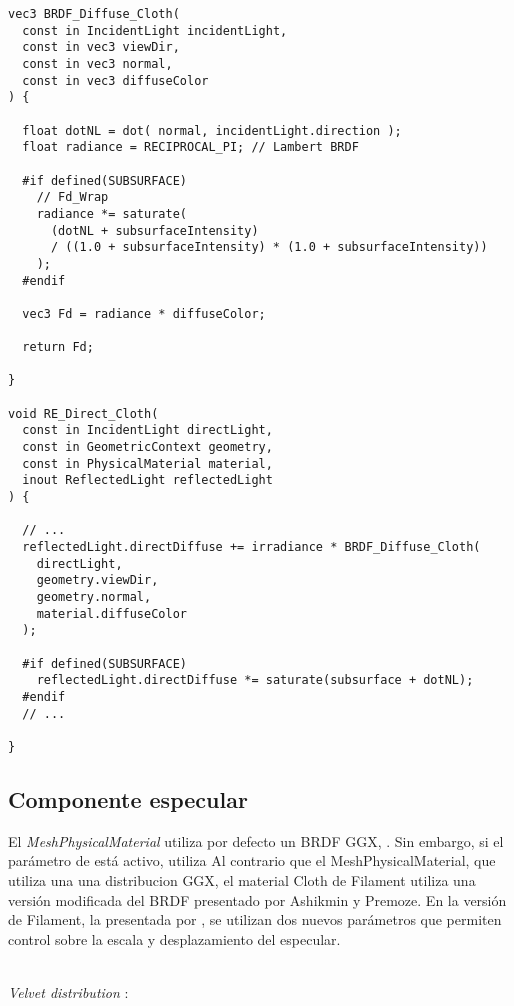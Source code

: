   \singlespacing
  \begin{lstlisting}[caption=Implementaci\'on del BRDF para la componente difusa de \textit{MeshClothMaterial}]
vec3 BRDF_Diffuse_Cloth(
  const in IncidentLight incidentLight,
  const in vec3 viewDir,
  const in vec3 normal,
  const in vec3 diffuseColor
) {

  float dotNL = dot( normal, incidentLight.direction );
  float radiance = RECIPROCAL_PI; // Lambert BRDF
  
  #if defined(SUBSURFACE)
    // Fd_Wrap
    radiance *= saturate(
      (dotNL + subsurfaceIntensity)
      / ((1.0 + subsurfaceIntensity) * (1.0 + subsurfaceIntensity))
    );
  #endif

  vec3 Fd = radiance * diffuseColor;

  return Fd;

}

void RE_Direct_Cloth(
  const in IncidentLight directLight,
  const in GeometricContext geometry,
  const in PhysicalMaterial material,
  inout ReflectedLight reflectedLight
) {

  // ...
  reflectedLight.directDiffuse += irradiance * BRDF_Diffuse_Cloth(
    directLight,
    geometry.viewDir,
    geometry.normal,
    material.diffuseColor
  );

  #if defined(SUBSURFACE)
    reflectedLight.directDiffuse *= saturate(subsurface + dotNL); 
  #endif
  // ...

}
  \end{lstlisting}


  \subsection{Componente especular}

  El \textit{MeshPhysicalMaterial} utiliza por defecto un BRDF GGX, \autocite{ggx}. Sin embargo, si el par\'ametro de 
  est\'a activo, utiliza 
  Al contrario que el MeshPhysicalMaterial, que utiliza una una distribucion GGX, el material
  Cloth de Filament utiliza una versi\'on modificada del BRDF presentado por Ashikmin y Premoze. En la versi\'on de Filament,
  la presentada por \autocite{theordertalk}, se utilizan dos nuevos par\'ametros que permiten control sobre la escala
  y desplazamiento del especular. 

  \autocite{ashikhmin}\\

  \textit{Velvet distribution} \autocite{ashikhmin}:\\

